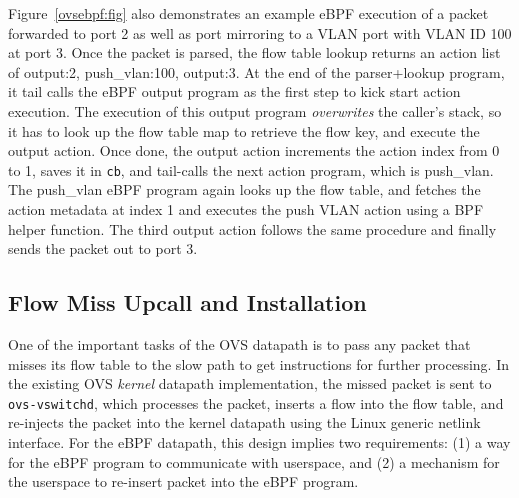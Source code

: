 \documentclass[10pt,numbers,reprint]{sigplanconf}
\newcommand{\saveforlater}[1]{}
\begin{document}
Figure~\ref{ovsebpf:fig} also demonstrates an example eBPF execution of a
packet forwarded to port 2 as well as port mirroring to a VLAN port with VLAN ID
100 at port 3.  Once the packet is parsed,
the flow table lookup returns an action list of output:2, push\_vlan:100,
output:3.  At the end of the parser+lookup program, it tail calls the eBPF
output program as the first step to kick start action execution.
The execution of this output program {\em overwrites} the caller's stack,
so it has to look up the flow table map to retrieve the flow key,
and execute the output action.  Once done, the output action increments the
action index from 0 to 1, saves it in \verb+cb+, and tail-calls the next action
program, which is push\_vlan.  The push\_vlan eBPF program again 
looks up the flow table, and fetches the action metadata at index 1
and executes the push VLAN action using a BPF helper function.
The third output action follows the same procedure and finally sends the
packet out to port 3.
\saveforlater{Appendix A shows the eBPF helper functions used in
each eBPF action program implementation.}

\subsection{Flow Miss Upcall and Installation}
One of the important tasks of the OVS datapath is to pass any packet that
misses its flow table to the slow path to get instructions for
further processing.  In the existing OVS {\em kernel} datapath implementation,
the missed packet is sent to \verb+ovs-vswitchd+, which processes the packet,
inserts a flow into the flow table, and re-injects the packet into the kernel
datapath using the Linux generic netlink interface.  For the eBPF datapath, this
design implies two requirements: (1) a way for the eBPF program to communicate
with userspace, and (2) a mechanism for the userspace to re-insert packet into
the eBPF program.
\end{document}
